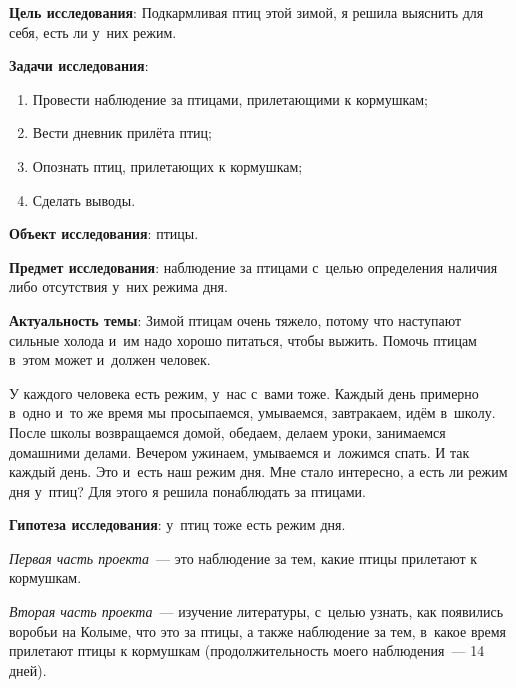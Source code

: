


\makeProcTitleSchool



\textbf{Цель исследования}: Подкармливая птиц этой зимой, я решила выяснить для себя, есть ли у~них режим.

\textbf{Задачи исследования}:
\begin{enumerate}[noitemsep]\vspace{-8pt}
\item Провести наблюдение за птицами, прилетающими к кормушкам;
\item Вести дневник прилёта птиц;
\item Опознать птиц, прилетающих к кормушкам;
\item Сделать выводы.
\end{enumerate}\vspace{-8pt}
\textbf{Объект исследования}: птицы.

\textbf{Предмет исследования}: наблюдение за птицами с~целью определения наличия либо отсутствия у~них режима дня.

\textbf{Актуальность темы}: Зимой птицам очень тяжело, потому что наступают сильные холода и~им надо хорошо питаться, чтобы выжить. Помочь птицам в~этом может и~должен человек.

У каждого человека есть режим, у~нас с~вами тоже. Каждый день примерно в~одно и~то же время мы просыпаемся, умываемся, завтракаем, идём в~школу. После школы возвращаемся домой, обедаем, делаем уроки, занимаемся домашними делами. Вечером ужинаем, умываемся и~ложимся спать. И так каждый день. Это и~есть наш режим дня. Мне стало интересно, а есть ли режим дня у~птиц? Для этого я решила понаблюдать за птицами.

\textbf{Гипотеза исследования}: у~птиц тоже есть режим дня.

\textit{Первая часть проекта}~--- это наблюдение за тем, какие птицы прилетают к кормушкам.

\textit{Вторая часть проекта}~--- изучение литературы, с~целью узнать, как появились воробьи на Колыме, что это за птицы, а также наблюдение за тем, в~какое время прилетают птицы к кормушкам (продолжительность моего наблюдения~--- 14 дней).

